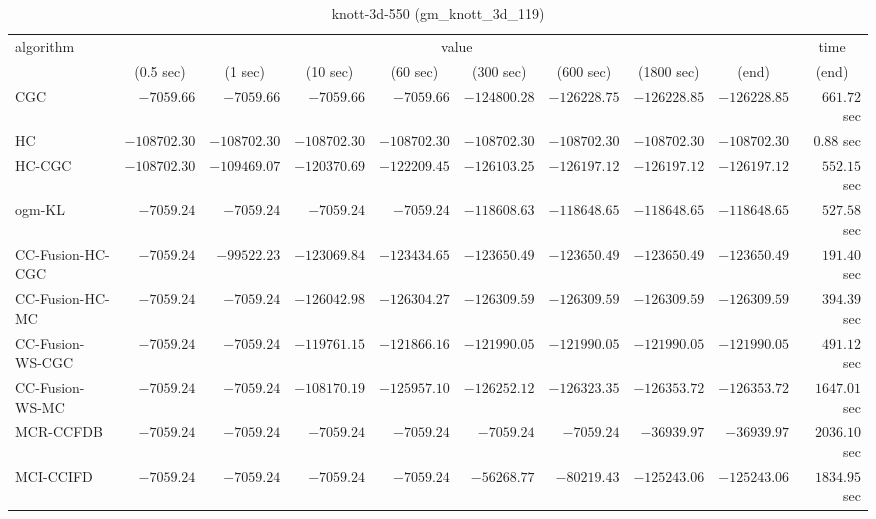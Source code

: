 \begin{table}[H]
\scriptsize
\centering
\caption{knott-3d-550 (gm\_knott\_3d\_119)}
\label{tab:anytimetable-knott-3d-550-gm-knott-3d-119}
\begin{tabular}{lrrrrrrrrr}
\toprule
           algorithm &                                   \multicolumn{8}{c}{value} & \multicolumn{1}{c}{time}   \\  
\cmidrule(lr){2-9}\cmidrule(lr){10-10}   
                     & \multicolumn{1}{c}{(0.5 sec)} & \multicolumn{1}{c}{(1 sec)} & \multicolumn{1}{c}{(10 sec)} & \multicolumn{1}{c}{(60 sec)} & \multicolumn{1}{c}{(300 sec)} & \multicolumn{1}{c}{(600 sec)} & \multicolumn{1}{c}{(1800 sec)} & \multicolumn{1}{c}{(end)} & \multicolumn{1}{c}{(end)}   \\ \midrule 
                 CGC & $     -7059.66$ & $     -7059.66$ & $     -7059.66$ & $     -7059.66$ & $   -124800.28$ & $   -126228.75$ & $   -126228.85$ & $   -126228.85$ & $       661.72$ sec   \\ 
                  HC & $   -108702.30$ & $   -108702.30$ & $   -108702.30$ & $   -108702.30$ & $   -108702.30$ & $   -108702.30$ & $   -108702.30$ & $   -108702.30$ & $         0.88$ sec   \\ 
              HC-CGC & $   -108702.30$ & $   -109469.07$ & $   -120370.69$ & $   -122209.45$ & $   -126103.25$ & $   -126197.12$ & $   -126197.12$ & $   -126197.12$ & $       552.15$ sec   \\ 
              ogm-KL & $     -7059.24$ & $     -7059.24$ & $     -7059.24$ & $     -7059.24$ & $   -118608.63$ & $   -118648.65$ & $   -118648.65$ & $   -118648.65$ & $       527.58$ sec   \\ 
    CC-Fusion-HC-CGC & $     -7059.24$ & $    -99522.23$ & $   -123069.84$ & $   -123434.65$ & $   -123650.49$ & $   -123650.49$ & $   -123650.49$ & $   -123650.49$ & $       191.40$ sec   \\ 
     CC-Fusion-HC-MC & $     -7059.24$ & $     -7059.24$ & $   -126042.98$ & $   -126304.27$ & $   -126309.59$ & $   -126309.59$ & $   -126309.59$ & $   -126309.59$ & $       394.39$ sec   \\ 
    CC-Fusion-WS-CGC & $     -7059.24$ & $     -7059.24$ & $   -119761.15$ & $   -121866.16$ & $   -121990.05$ & $   -121990.05$ & $   -121990.05$ & $   -121990.05$ & $       491.12$ sec   \\ 
     CC-Fusion-WS-MC & $     -7059.24$ & $     -7059.24$ & $   -108170.19$ & $   -125957.10$ & $   -126252.12$ & $   -126323.35$ & $   -126353.72$ & $   -126353.72$ & $      1647.01$ sec   \\ 
\cmidrule{1-1} 
           MCR-CCFDB & $     -7059.24$ & $     -7059.24$ & $     -7059.24$ & $     -7059.24$ & $     -7059.24$ & $     -7059.24$ & $    -36939.97$ & $    -36939.97$ & $      2036.10$ sec   \\ 
\cmidrule{1-1} 
           MCI-CCIFD & $     -7059.24$ & $     -7059.24$ & $     -7059.24$ & $     -7059.24$ & $    -56268.77$ & $    -80219.43$ & $   -125243.06$ & $   -125243.06$ & $      1834.95$ sec   \\ 
\bottomrule
\end{tabular}
\end{table}

